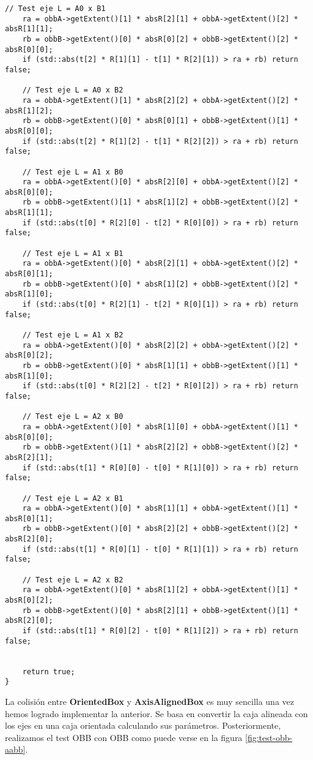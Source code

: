 \begin{lstlisting}[style=C++]
    // Test eje L = A0 x B1
    ra = obbA->getExtent()[1] * absR[2][1] + obbA->getExtent()[2] * absR[1][1];
    rb = obbB->getExtent()[0] * absR[0][2] + obbB->getExtent()[2] * absR[0][0];
    if (std::abs(t[2] * R[1][1] - t[1] * R[2][1]) > ra + rb) return false;

    // Test eje L = A0 x B2
    ra = obbA->getExtent()[1] * absR[2][2] + obbA->getExtent()[2] * absR[1][2];
    rb = obbB->getExtent()[0] * absR[0][1] + obbB->getExtent()[1] * absR[0][0];
    if (std::abs(t[2] * R[1][2] - t[1] * R[2][2]) > ra + rb) return false;

    // Test eje L = A1 x B0
    ra = obbA->getExtent()[0] * absR[2][0] + obbA->getExtent()[2] * absR[0][0];
    rb = obbB->getExtent()[1] * absR[1][2] + obbB->getExtent()[2] * absR[1][1];
    if (std::abs(t[0] * R[2][0] - t[2] * R[0][0]) > ra + rb) return false;

    // Test eje L = A1 x B1
    ra = obbA->getExtent()[0] * absR[2][1] + obbA->getExtent()[2] * absR[0][1];
    rb = obbB->getExtent()[0] * absR[1][2] + obbB->getExtent()[2] * absR[1][0];
    if (std::abs(t[0] * R[2][1] - t[2] * R[0][1]) > ra + rb) return false;
   
    // Test eje L = A1 x B2
    ra = obbA->getExtent()[0] * absR[2][2] + obbA->getExtent()[2] * absR[0][2];
    rb = obbB->getExtent()[0] * absR[1][1] + obbB->getExtent()[1] * absR[1][0];
    if (std::abs(t[0] * R[2][2] - t[2] * R[0][2]) > ra + rb) return false;

    // Test eje L = A2 x B0
    ra = obbA->getExtent()[0] * absR[1][0] + obbA->getExtent()[1] * absR[0][0];
    rb = obbB->getExtent()[1] * absR[2][2] + obbB->getExtent()[2] * absR[2][1];
    if (std::abs(t[1] * R[0][0] - t[0] * R[1][0]) > ra + rb) return false;

    // Test eje L = A2 x B1
    ra = obbA->getExtent()[0] * absR[1][1] + obbA->getExtent()[1] * absR[0][1];
    rb = obbB->getExtent()[0] * absR[2][2] + obbB->getExtent()[2] * absR[2][0];
    if (std::abs(t[1] * R[0][1] - t[0] * R[1][1]) > ra + rb) return false;

    // Test eje L = A2 x B2
    ra = obbA->getExtent()[0] * absR[1][2] + obbA->getExtent()[1] * absR[0][2];
    rb = obbB->getExtent()[0] * absR[2][1] + obbB->getExtent()[1] * absR[2][0];
    if (std::abs(t[1] * R[0][2] - t[0] * R[1][2]) > ra + rb) return false;


    return true;
}
\end{lstlisting}

La colisión entre \textbf{OrientedBox} y \textbf{AxisAlignedBox} es muy
sencilla una vez hemos logrado implementar la anterior. Se basa en convertir
la caja alineada con los ejes en una caja orientada calculando sus parámetros.
Posteriormente, realizamos el test OBB con OBB como puede verse en la figura
\ref{fig:test-obb-aabb}.\\


